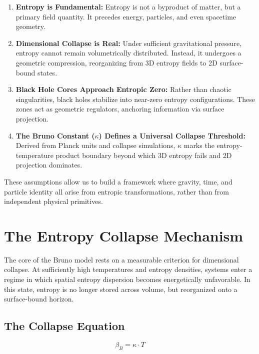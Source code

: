 \documentclass[12pt]{article}
\begin{document}
\begin{enumerate}[label=\textbf{A\arabic*.}, leftmargin=1.75em]
  \item \textbf{Entropy is Fundamental:} Entropy is not a byproduct of matter, but a primary field quantity. It precedes energy, particles, and even spacetime geometry.
  
  \item \textbf{Dimensional Collapse is Real:} Under sufficient gravitational pressure, entropy cannot remain volumetrically distributed. Instead, it undergoes a geometric compression, reorganizing from 3D entropy fields to 2D surface-bound states.
  
  \item \textbf{Black Hole Cores Approach Entropic Zero:} Rather than chaotic singularities, black holes stabilize into near-zero entropy configurations. These zones act as geometric regulators, anchoring information via surface projection.
  
  \item \textbf{The Bruno Constant ($\kappa$) Defines a Universal Collapse Threshold:} Derived from Planck units and collapse simulations, $\kappa$ marks the entropy-temperature product boundary beyond which 3D entropy fails and 2D projection dominates.
\end{enumerate}

These assumptions allow us to build a framework where gravity, time, and particle identity all arise from entropic transformations, rather than from independent physical primitives.

\vspace{1em}

\clearpage
\section{The Entropy Collapse Mechanism}
\FloatBarrier

\begin{samepage}
The core of the Bruno model rests on a measurable criterion for dimensional collapse. At sufficiently high temperatures and entropy densities, systems enter a regime in which spatial entropy dispersion becomes energetically unfavorable. In this state, entropy is no longer stored across volume, but reorganized onto a surface-bound horizon.

\clearpage
\subsection*{The Collapse Equation}

\end{samepage}
\begin{equation}
\beta_B = \kappa \cdot T
\end{equation}
\end{document}

